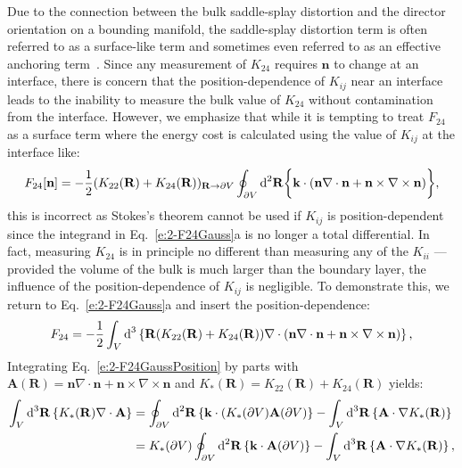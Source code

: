 Due to the connection between the bulk saddle-splay distortion and the director orientation on a bounding manifold, the saddle-splay distortion term is often referred to as a surface-like term and sometimes even referred to as an effective anchoring term~\cite{RN33,RN194,RN58,RN57}.
Since any measurement of $K_{24}$ requires $\mathbf{n}$ to change at an interface, there is concern that the position-dependence of $K_{ij}$ near an interface leads to the inability to measure the bulk value of $K_{24}$ without contamination from the interface.
However, we emphasize that while it is tempting to treat $F_{24}$ as a surface term where the energy cost is calculated using the value of $K_{ij}$ at the interface like:
\begin{equation}
  F_{24}[\mathbf{n}] = - \frac{1}{2}(K_{22}(\mathbf{R}) + K_{24}(\mathbf{R}))_{\mathbf{R} \rightarrow \partial V} \oint_{\partial V} \textup{d}^2  \mathbf{R} \bigg \{   \mathbf{k} \cdot (\mathbf{n}\nabla \cdot \mathbf{n} + \mathbf{n} \times \nabla \times \mathbf{n}) \bigg \},
\end{equation}
this is incorrect as Stokes's theorem cannot be used if $K_{ij}$ is position-dependent since the integrand in Eq.~\ref{e:2-F24Gauss}a is no longer a total differential.
In fact, measuring $K_{24}$ is in principle no different than measuring any of the $K_{ii}$ --- provided the volume of the bulk is much larger than the boundary layer, the influence of the position-dependence of $K_{ij}$ is negligible.
To demonstrate this, we return to Eq.~\ref{e:2-F24Gauss}a and insert the position-dependence:
\begin{equation}
  F_{24} = -\frac{1}{2}\int_{V}\textup{d}^3 \left \{\mathbf{R} (K_{22} (\mathbf{R}) + K_{24}(\mathbf{R})) \nabla \cdot (\mathbf{n} \nabla \cdot \mathbf{n} + \mathbf{n} \times \nabla \times \mathbf{n}) \right \},\label{e:2-F24GaussPosition}
\end{equation}
Integrating Eq.~\ref{e:2-F24GaussPosition} by parts with $\mathbf{A}(\mathbf{R}) = \mathbf{n} \nabla \cdot \mathbf{n} + \mathbf{n} \times \nabla \times \mathbf{n}$ and $K_*(\mathbf{R}) = K_{22} (\mathbf{R}) + K_{24}(\mathbf{R})$ yields:
\begin{align}
  \int_{V}\textup{d}^3\mathbf{R} \left \{ K_{*} (\mathbf{R}) \nabla \cdot \mathbf{A} \right \} &=
  \oint_{\partial V}\textup{d}^2 \mathbf{R} \left \{ \mathbf{k} \cdot (K_{*} (\partial V) \mathbf{A}(\partial V) \right \} -  \int_{V} \textup{d}^3\mathbf{R} \left \{ \mathbf{A} \cdot \nabla K_{*} (\mathbf{R}) \right \}  \\ &=
  K_*(\partial V) \oint_{\partial V} \textup{d}^2\mathbf{R} \left \{ \mathbf{k} \cdot \mathbf{A}(\partial V)\right \} - \int_{V} \textup{d}^3\mathbf{R} \left \{ \mathbf{A} \cdot \nabla K_{*} (\mathbf{R}) \right \}, \label{e:2-pos_stokes1}
\end{align}
